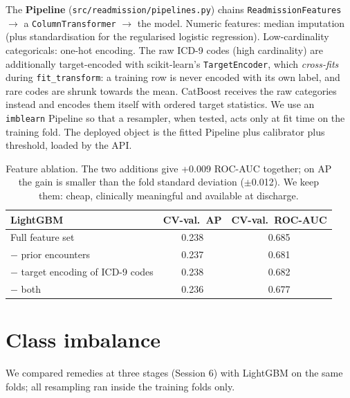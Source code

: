 \documentclass[11pt,a4paper]{article}
\newcommand{\code}[1]{\texttt{\small #1}}
\begin{document}
The \textbf{Pipeline} (\code{src/readmission/pipelines.py}) chains \code{ReadmissionFeatures} $\rightarrow$ a \code{ColumnTransformer} $\rightarrow$ the model. Numeric features: median imputation (plus standardisation for the regularised logistic regression). Low-cardinality categoricals: one-hot encoding. The raw ICD-9 codes (high cardinality) are additionally target-encoded with scikit-learn's \code{TargetEncoder}, which \emph{cross-fits} during \code{fit\_transform}: a training row is never encoded with its own label, and rare codes are shrunk towards the mean. CatBoost receives the raw categories instead and encodes them itself with ordered target statistics. We use an \code{imblearn} Pipeline so that a resampler, when tested, acts only at fit time on the training fold. The deployed object is the fitted Pipeline plus calibrator plus threshold, loaded by the API.

\begin{table}[H]
\centering\small
\begin{tabular}{lcc}
\toprule
LightGBM & CV-val.\ AP & CV-val.\ ROC-AUC \\
\midrule
Full feature set & 0.238 & 0.685 \\
$-$ prior encounters & 0.237 & 0.681 \\
$-$ target encoding of ICD-9 codes & 0.238 & 0.682 \\
$-$ both & 0.236 & 0.677 \\
\bottomrule
\end{tabular}
\caption{Feature ablation. The two additions give +0.009 ROC-AUC together; on AP the gain is smaller than the fold standard deviation ($\pm$0.012). We keep them: cheap, clinically meaningful and available at discharge.}
\label{tab:ablation}
\end{table}

\section{Class imbalance}
\label{sec:imbalance}

We compared remedies at three stages (Session 6) with LightGBM on the same folds; all resampling ran inside the training folds only.
\end{document}
